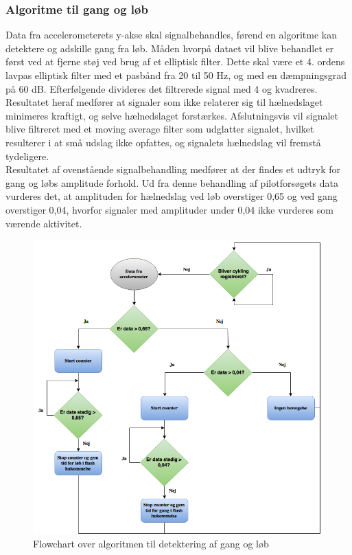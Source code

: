 \subsubsection{Algoritme til gang og løb}
Data fra accelerometerets y-akse skal signalbehandles, førend en algoritme kan detektere og adskille gang fra løb. Måden hvorpå dataet vil blive behandlet er først ved at fjerne støj ved brug af et elliptisk filter. Dette skal være et 4. ordens lavpas elliptisk filter med et pasbånd fra 20 til 50 Hz, og med en dæmpningsgrad på 60 dB. Efterfølgende divideres det filtrerede signal med 4 og kvadreres. Resultatet heraf medfører at signaler som ikke relaterer sig til hælnedslaget minimeres kraftigt, og selve hælnedslaget forstærkes.
Afslutningsvis vil signalet blive filtreret med et moving average filter som udglatter signalet, hvilket resulterer i at små udslag ikke opfattes, og signalets hælnedslag vil fremstå tydeligere. \\
Resultatet af ovenstående signalbehandling medfører at der findes et udtryk for gang og løbs amplitude forhold. Ud fra denne behandling af pilotforsøgets data vurderes det, at amplituden for hælnedslag ved løb overstiger 0,65 og ved gang overstiger 0,04, hvorfor signaler med amplituder under 0,04 ikke vurderes som værende aktivitet.
\begin{figure}[H]
	\centering
	\includegraphics[scale=0.5]{figures/cDesign/algoritme_gl.png}
	\caption{Flowchart over algoritmen til detektering af gang og løb}
	\label{fig:algoritme}
\end{figure}
